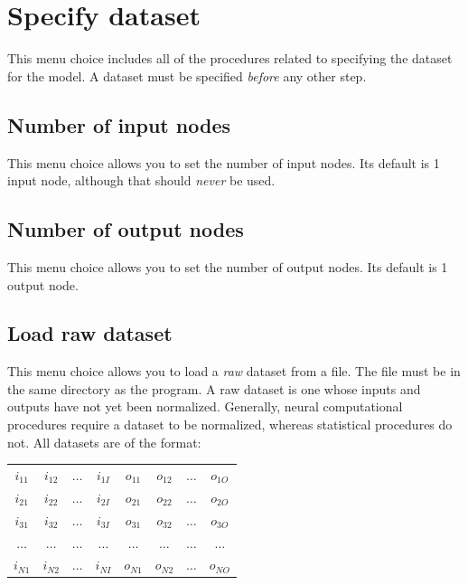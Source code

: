 \setcounter{figcount}{1}

\section{Specify dataset}

This menu choice includes all of the procedures related to specifying
the dataset for the model.  A dataset must be specified {\em before}
any other step.

\subsection{Number of input nodes}

This menu choice allows you to set the number of input nodes.  Its
default is 1 input node, although that should {\em never} be used.

\subsection{Number of output nodes}

This menu choice allows you to set the number of output nodes.  Its
default is 1 output node.

\subsection{Load raw dataset}

This menu choice allows you to load a {\em raw} dataset from a file.
The file must be in the same directory as the program.  A raw dataset
is one whose inputs and outputs have not yet been normalized.
Generally, neural computational procedures require a dataset to be
normalized, whereas statistical procedures do not.  All datasets are
of the format:

\begin{center}
\begin{tabular}{cccccccc}
$i_{11}$ & $i_{12}$ & $\ldots$ & $i_{1I}$ & $o_{11}$ & $o_{12}$ &
$\ldots$ & $o_{1O}$ \\
$i_{21}$ & $i_{22}$ & $\ldots$ & $i_{2I}$ & $o_{21}$ & $o_{22}$ &
$\ldots$ & $o_{2O}$ \\
$i_{31}$ & $i_{32}$ & $\ldots$ & $i_{3I}$ & $o_{31}$ & $o_{32}$ &
$\ldots$ & $o_{3O}$ \\
$\ldots$ & $\ldots$ & $\ldots$ & $\ldots$ & $\ldots$ & $\ldots$ &
$\ldots$ & $\ldots$ \\
$i_{N1}$ & $i_{N2}$ & $\ldots$ & $i_{NI}$ & $o_{N1}$ & $o_{N2}$ &
$\ldots$ & $o_{NO}$ \\
\end{tabular}
\end{center}

